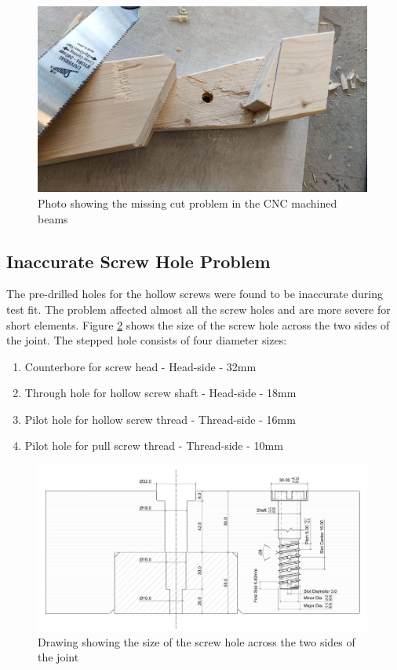 \begin{figure}[!h]
    \centering
    \includegraphics[width=0.99\textwidth]{images/7b/img67.jpg}
    \caption{Photo showing the missing cut problem in the CNC machined beams}
    \label{fig:photo-missing-cut-problem}
\end{figure}

\subsection{Inaccurate Screw Hole Problem}
\label{subsection:exploration-4-inaccurate-screw-hole-problem}

The pre-drilled holes for the hollow screws were found to be inaccurate during test fit. The problem affected almost all the screw holes and are more severe for short elements. Figure \ref{fig:screw-hole-drawing} shows the size of the screw hole across the two sides of the joint. The stepped hole consists of four diameter sizes:

\begin{enumerate}
    \item Counterbore for screw head - Head-side - 32mm
    \item Through hole for hollow screw shaft - Head-side - 18mm
    \item Pilot hole for hollow screw thread - Thread-side - 16mm
    \item Pilot hole for pull screw thread - Thread-side - 10mm
\end{enumerate}

\begin{figure}[!h]
    \centering
    \includegraphics[width=0.99\textwidth]{images/7b/img68.jpg}
    \caption{Drawing showing the size of the screw hole across the two sides of the joint}
    \label{fig:screw-hole-drawing}
\end{figure}

